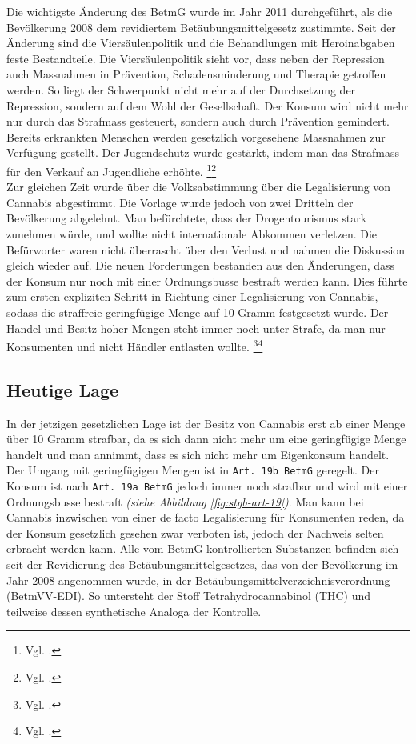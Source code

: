 \documentclass[../main.tex]{subfiles}
\begin{document}
	 \noindent
	 Die wichtigste Änderung des BetmG wurde im Jahr 2011 durchgeführt, als die Bevölkerung 2008 dem revidiertem Betäubungsmittelgesetz zustimmte. 
	 Seit der Änderung sind die Viersäulenpolitik und die Behandlungen mit Heroinabgaben feste Bestandteile. 
	 Die Viersäulenpolitik sieht vor, dass neben der Repression auch Massnahmen in Prävention, Schadensminderung und Therapie getroffen werden.
	 So liegt der Schwerpunkt nicht mehr auf der Durchsetzung der Repression, sondern auf dem Wohl der Gesellschaft.
	 Der Konsum wird nicht mehr nur durch das Strafmass gesteuert, sondern auch durch Prävention gemindert. 
	 Bereits erkrankten Menschen werden gesetzlich vorgesehene Massnahmen zur Verfügung gestellt.
	 Der Jugendschutz wurde gestärkt, indem man das Strafmass für den Verkauf an Jugendliche erhöhte.%
	 \footnote{Vgl. \cite{infoset-01}.}\footnote{Vgl. \cite{parlament-01}.}\\
	 
	 \noindent
	 Zur gleichen Zeit wurde über die Volksabstimmung über die Legalisierung von Cannabis abgestimmt.
	 Die Vorlage wurde jedoch von zwei Dritteln der Bevölkerung abgelehnt.
	 Man befürchtete, dass der Drogentourismus stark zunehmen würde, und wollte nicht internationale Abkommen verletzen.
	 Die Befürworter waren nicht überrascht über den Verlust und nahmen die Diskussion gleich wieder auf. 
	 Die neuen Forderungen bestanden aus den Änderungen, dass der Konsum nur noch mit einer Ordnungsbusse bestraft werden kann. 
	 Dies führte zum ersten expliziten Schritt in Richtung einer Legalisierung von Cannabis, sodass die straffreie geringfügige Menge auf 10 Gramm festgesetzt wurde.
	 Der Handel und Besitz hoher Mengen steht immer noch unter Strafe, da man nur Konsumenten und nicht Händler entlasten wollte.%
	 \footnote{Vgl. \cite{infoset-02}.}\footnote{Vgl. \cite{parlament-02}.}
	 
	 
	 \subsection{Heutige Lage}
	 In der jetzigen gesetzlichen Lage ist der Besitz von Cannabis erst ab einer Menge über 10 Gramm strafbar, da es sich dann nicht mehr um eine geringfügige Menge handelt und man annimmt, dass es sich nicht mehr um Eigenkonsum handelt.
	 Der Umgang mit geringfügigen Mengen ist in \texttt{Art. 19b BetmG} geregelt.
	 Der Konsum ist nach \texttt{Art. 19a BetmG} jedoch immer noch strafbar und wird mit einer Ordnungsbusse bestraft \textit{(siehe Abbildung \ref{fig:stgb-art-19})}. 
	 Man kann bei Cannabis inzwischen von einer de facto Legalisierung für Konsumenten reden, da der Konsum gesetzlich gesehen zwar verboten ist, jedoch der Nachweis selten erbracht werden kann. 
	 Alle vom BetmG kontrollierten Substanzen befinden sich seit der Revidierung des Betäubungsmittelgesetzes, das von der Bevölkerung im Jahr 2008 angenommen wurde, in der Betäubungsmittelverzeichnisverordnung (BetmVV-EDI). 
	 So untersteht der Stoff Tetrahydrocannabinol (THC) und teilweise dessen synthetische Analoga der Kontrolle.\vspace{2pt}
	 
\end{document}
